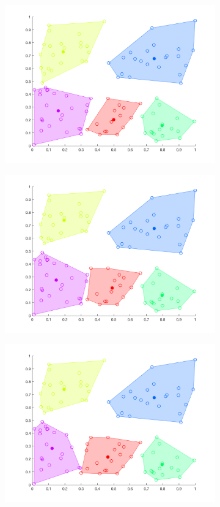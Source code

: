 \documentclass[12pt]{article}
\begin{document}
\begin{figure}[t!]
\begin{subfigure}[b]{0.25\textwidth}
        \includegraphics[width=\textwidth]{k-means_8}
    \end{subfigure}
    \begin{subfigure}[b]{0.25\textwidth}
        \includegraphics[width=\textwidth]{k-means_9}
    \end{subfigure}
    \begin{subfigure}[b]{0.25\textwidth}
        \includegraphics[width=\textwidth]{k-means_10}

\end{subfigure}
\end{figure}
\end{document}
